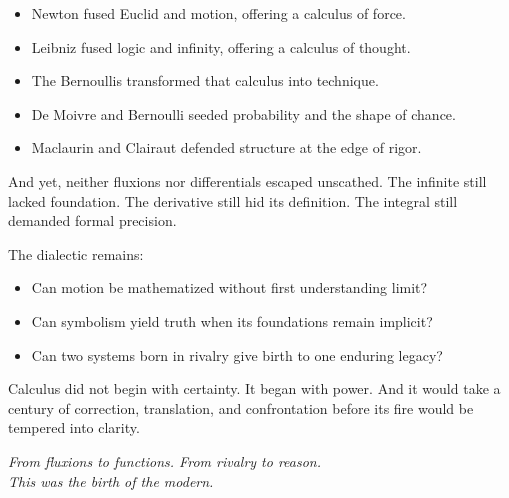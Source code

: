 \documentclass[9pt]{article}
\begin{document}
\begin{itemize}
  \item Newton fused Euclid and motion, offering a calculus of force.
  \item Leibniz fused logic and infinity, offering a calculus of thought.
  \item The Bernoullis transformed that calculus into technique.
  \item De Moivre and Bernoulli seeded probability and the shape of chance.
  \item Maclaurin and Clairaut defended structure at the edge of rigor.
\end{itemize}

\noindent
And yet, neither fluxions nor differentials escaped unscathed.  
The infinite still lacked foundation.  
The derivative still hid its definition.  
The integral still demanded formal precision.

\noindent
The dialectic remains:

\begin{itemize}
  \item Can motion be mathematized without first understanding limit?
  \item Can symbolism yield truth when its foundations remain implicit?
  \item Can two systems born in rivalry give birth to one enduring legacy?
\end{itemize}

\noindent
Calculus did not begin with certainty. It began with power.  
And it would take a century of correction, translation, and confrontation  
before its fire would be tempered into clarity.

\begin{center}
    \textit{From fluxions to functions. From rivalry to reason.} \\
    \textit{This was the birth of the modern.}
\end{center}
\end{document}
